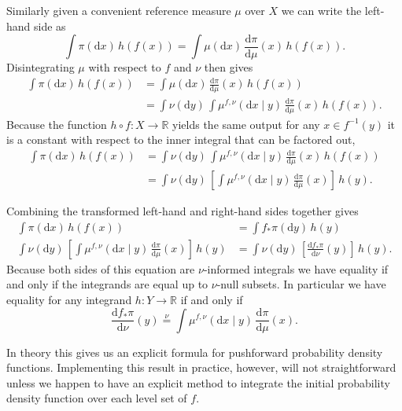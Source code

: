 \documentclass[11pt, oneside]{article}
\newcommand{\rnd}[2]{
  \ensuremath{ \frac{ \mathrm{d} #1}{ \mathrm{d} #2 } }
}
\begin{document}
Similarly given a convenient reference measure $\mu$ over $X$ we can write the left-hand
side as
%
\begin{equation*}
\int \pi( \mathrm{d} x ) \, h(f(x))
=
\int \mu( \mathrm{d} x ) \, \rnd{\pi}{\mu}(x) \, h(f(x)).
\end{equation*}
%
Disintegrating $\mu$ with respect to $f$ and $\nu$ then gives
%
\begin{align*}
\int \pi( \mathrm{d} x ) \, h(f(x))
&=
\int \mu( \mathrm{d} x ) \, \rnd{\pi}{\mu}(x) \, h(f(x))
\\
&=
\int \nu( \mathrm{d} y ) \, \int \mu^{f, \nu}( \mathrm{d} x \mid y ) \, \rnd{\pi}{\mu}(x) \, h(f(x)).
\end{align*}
%
Because the function $h \circ f : X \rightarrow \mathbb{R}$ yields the same output for any 
$x \in f^{-1}(y)$ it is a constant with respect to the inner integral that can be factored out,
%
\begin{align*}
\int \pi( \mathrm{d} x ) \, h(f(x))
&=
\int \nu( \mathrm{d} y ) \, \int \mu^{f, \nu}( \mathrm{d} x \mid y ) \, \rnd{\pi}{\mu}(x) \, h(f(x))
\\
&=
\int \nu( \mathrm{d} y ) \, 
\left[ \int \mu^{f, \nu}( \mathrm{d} x \mid y ) \, \rnd{\pi}{\mu}(x) \right] \, h(y).
\end{align*}

Combining the transformed left-hand and right-hand sides together gives
%
\begin{align*}
\int \pi( \mathrm{d} x ) \, h(f(x)) 
&= 
\int f_{*} \pi( \mathrm{d} y )  \, h(y)
\\
\int \nu( \mathrm{d} y ) \, 
\left[ \int \mu^{f, \nu}( \mathrm{d} x \mid y ) \, \rnd{\pi}{\mu}(x) \right] \, h(y)
&=
\int \nu( \mathrm{d} y ) \, \left[ \rnd{f_{*}\pi}{\nu}(y) \right] \, h(y).
\end{align*}
%
Because both sides of this equation are $\nu$-informed integrals we have equality if and only if the 
integrands are equal up to $\nu$-null subsets. In particular we have equality for any integrand 
$h : Y \rightarrow \mathbb{R}$ if and only if
%
\begin{equation*}
\rnd{f_{*}\pi}{\nu}(y) 
\overset{\nu}{=}
\int \mu^{f, \nu}( \mathrm{d} x \mid y ) \, \rnd{\pi}{\mu}(x).
\end{equation*}

In theory this gives us an explicit formula for pushforward probability density functions.  
Implementing this result in practice, however, will not straightforward unless we happen 
to have an explicit method to integrate the initial probability density function over each 
level set of $f$.
\end{document}
